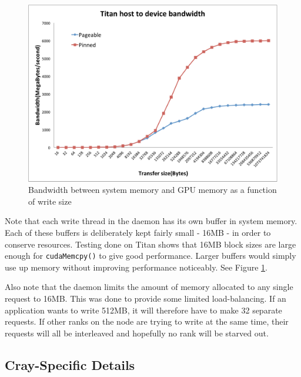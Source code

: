 \begin{figure}
\includegraphics[width=\linewidth]{figures/Host2Device_BW.pdf}
\caption{Bandwidth between system memory and GPU memory as a function of write size\cite{ac_guide}} 
\label{fig:transfer_bw}
\end{figure}

Note that each write thread in the daemon has its own buffer in system memory.  Each of these buffers is deliberately kept fairly small - 16MB - in order to conserve resources.  Testing done on Titan shows that 16MB block sizes are large enough for \texttt{cudaMemcpy()} to give good performance.\cite{ac_guide}  Larger buffers would simply use up memory without improving performance noticeably. See Figure \ref{fig:transfer_bw}.

Also note that the daemon limits the amount of memory allocated to any single request to 16MB.  This was done to provide some limited load-balancing.  If an application wants to write 512MB, it will therefore have to make 32 separate requests.  If other ranks on the node are trying to write at the same time, their requests will all be interleaved and hopefully no rank will be starved out.


\subsection{Cray-Specific Details}
\label{subsec:cray-specific}

